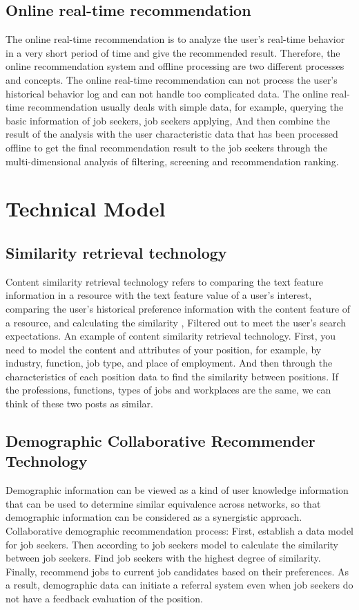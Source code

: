 \documentclass[sigconf]{acmart}
\begin{document}
\subsection{Online real-time recommendation}
The online real-time recommendation is to analyze the user's real-time behavior in a very short period of time and give the recommended result. Therefore, the online recommendation system and offline processing are two different processes and concepts. The online real-time recommendation can not process the user's historical behavior log and can not handle too complicated data. The online real-time recommendation usually deals with simple data, for example, querying the basic information of job seekers, job seekers applying, And then combine the result of the analysis with the user characteristic data that has been processed offline to get the final recommendation result to the job seekers through the multi-dimensional analysis of filtering, screening and recommendation ranking.


\section{Technical Model}

\subsection{Similarity retrieval technology}
Content similarity retrieval technology refers to comparing the text feature information in a resource with the text feature value of a user's interest, comparing the user's historical preference information with the content feature of a resource, and calculating the similarity , Filtered out to meet the user's search expectations. An example of content similarity retrieval technology. First, you need to model the content and attributes of your position, for example, by industry, function, job type, and place of employment. And then through the characteristics of each position data to find the similarity between positions. If the professions, functions, types of jobs and workplaces are the same, we can think of these two posts as similar.

\subsection{Demographic Collaborative Recommender Technology}
Demographic information can be viewed as a kind of user knowledge information that can be used to determine similar equivalence across networks, so that demographic information can be considered as a synergistic approach. Collaborative demographic recommendation process: First, establish a data model for job seekers. Then according to job seekers model to calculate the similarity between job seekers. Find job seekers with the highest degree of similarity. Finally, recommend jobs to current job candidates based on their preferences. As a result, demographic data can initiate a referral system even when job seekers do not have a feedback evaluation of the position.
\end{document}
